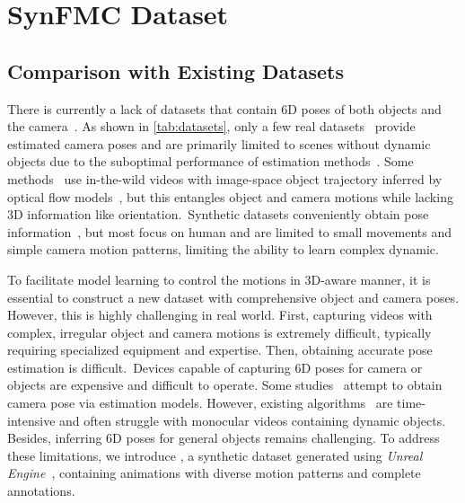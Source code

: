 \section{SynFMC Dataset}
\label{sec:dataset}

\subsection{Comparison with Existing Datasets}
\label{sec:dataset3.1}

There is currently a lack of datasets that contain 6D poses of both objects and the camera~\cite{RealEstate-10K,MVImageNet,HumanVid}. As shown in \cref{tab:datasets}, only a few real datasets~\cite{RealEstate-10K,MVImageNet} provide estimated camera poses and are primarily limited to scenes without dynamic objects due to the suboptimal performance of estimation methods~\cite{COLMAP,DROID-SLAM,ParticleSfM}. Some methods~\cite{DragNUWA,MotionCtrl} use in-the-wild videos with image-space object trajectory inferred by optical flow models~\cite{ParticleSfM}, but this entangles object and camera motions while lacking 3D information like orientation.~Synthetic datasets conveniently obtain pose information~\cite{BEDLAM,WHAC,HumanVid,SynBody}, but most focus on human and are limited to small movements and simple camera motion patterns, limiting the ability to learn complex dynamic.



To facilitate model learning to control the motions in 3D-aware manner, it is essential to construct a new dataset with comprehensive object and camera poses. However, this is highly challenging in real world. First, capturing videos with complex, irregular object and camera motions is extremely difficult, typically requiring specialized equipment and expertise. Then, obtaining accurate pose estimation is difficult.~Devices capable of capturing 6D poses for camera or objects are expensive and difficult to operate. Some studies~\cite{RealEstate-10K,MotionCtrl} attempt to obtain camera pose via estimation models. However, existing algorithms~\cite{ParticleSfM,DROID-SLAM} are time-intensive and often struggle with monocular videos containing dynamic objects. Besides, inferring 6D poses for general objects remains challenging. To address these limitations, we introduce \datasetname, a synthetic dataset generated using \emph{Unreal Engine}~\cite{unrealengine}, containing animations with diverse motion patterns and complete annotations.



